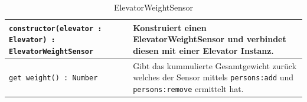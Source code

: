 \begin{table}[h!]
	\begin{tabularx}{0.92\textwidth}{XX}
		\texttt{constructor(elevator : Elevator) : ElevatorWeightSensor} & Konstruiert einen ElevatorWeightSensor und verbindet diesen mit einer Elevator Instanz. \\ \hline
		\texttt{get weight() : Number} & Gibt das kummulierte Gesamtgewicht zurück welches der Sensor mittels \texttt{persons:add} und \texttt{persons:remove} ermittelt hat. \\ \hline
	\end{tabularx}
\caption{ElevatorWeightSensor}
\end{table}

